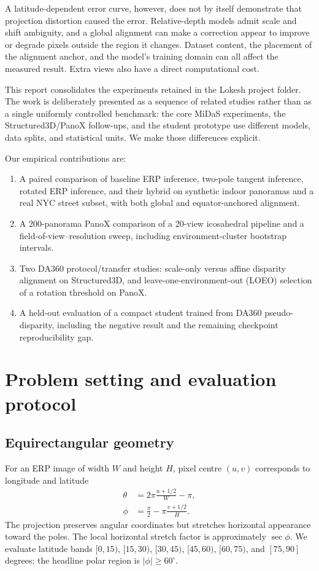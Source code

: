 \documentclass{article}
\newcommand{\polar}{|\phi|\geq60^\circ}
\begin{document}
A latitude-dependent error curve, however, does not by itself demonstrate that projection distortion caused the error. Relative-depth models admit scale and shift ambiguity, and a global alignment can make a correction appear to improve or degrade pixels outside the region it changes. Dataset content, the placement of the alignment anchor, and the model's training domain can all affect the measured result. Extra views also have a direct computational cost.

This report consolidates the experiments retained in the Lokesh project folder. The work is deliberately presented as a sequence of related studies rather than as a single uniformly controlled benchmark: the core MiDaS experiments, the Structured3D/PanoX follow-ups, and the student prototype use different models, data splits, and statistical units. We make those differences explicit.

Our empirical contributions are:
\begin{enumerate}
    \item A paired comparison of baseline ERP inference, two-pole tangent inference, rotated ERP inference, and their hybrid on synthetic indoor panoramas and a real NYC street subset, with both global and equator-anchored alignment.
    \item A 200-panorama PanoX comparison of a 20-view icosahedral pipeline and a field-of-view--resolution sweep, including environment-cluster bootstrap intervals.
    \item Two DA360 protocol/transfer studies: scale-only versus affine disparity alignment on Structured3D, and leave-one-environment-out (LOEO) selection of a rotation threshold on PanoX.
    \item A held-out evaluation of a compact student trained from DA360 pseudo-disparity, including the negative result and the remaining checkpoint reproducibility gap.
\end{enumerate}

\section{Problem setting and evaluation protocol}

\subsection{Equirectangular geometry}

For an ERP image of width $W$ and height $H$, pixel centre $(u,v)$ corresponds to longitude and latitude
\begin{align}
\theta &= 2\pi\frac{u+1/2}{W}-\pi,\\
\phi &= \frac{\pi}{2}-\pi\frac{v+1/2}{H}.
\end{align}
The projection preserves angular coordinates but stretches horizontal appearance toward the poles. The local horizontal stretch factor is approximately $\sec\phi$. We evaluate latitude bands $[0,15)$, $[15,30)$, $[30,45)$, $[45,60)$, $[60,75)$, and $[75,90]$ degrees; the headline polar region is $\polar$.
\end{document}
